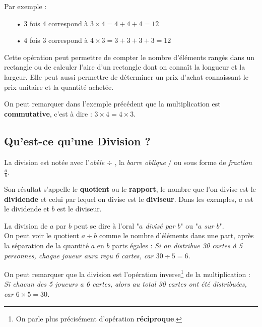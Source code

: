 \documentclass[a4paper, twoside]{article}
\begin{document}
			{\noindent Par exemple :}

			\begin{itemize}
			\onehalfspacing
			\item[•] 3 fois 4 correspond à $3 \times 4 = 4 + 4 + 4 = 12$
			\item[•] 4 fois 3 correspond à $4 \times 3 = 3 + 3 + 3 + 3 = 12$
			
			\end{itemize}
			\singlespacing
			\vspace{-2 mm}

			Cette opération peut permettre de compter le nombre d'éléments rangés 
			dans un rectangle ou de calculer l'aire d'un rectangle dont on connaît la longueur et la largeur. 
			Elle peut aussi permettre de déterminer un prix d'achat connaissant le prix unitaire et la quantité achetée.

			On peut remarquer dans l'exemple précédent que la multiplication 
			est \textbf{commutative}, c'est à dire : $3 \times 4 = 4 \times 3$.

			\vspace{5 mm}

		\subsection*{Qu'est-ce qu'une Division ?}

			La division est notée avec l'\textit{obèle} $\div$ ,
			la \textit{barre oblique} $ / $ ou sous forme de \textit{fraction} {\Large $ \frac{a}{b} $}.
			
			Son résultat s'appelle le \textbf{quotient} ou 
			le \textbf{rapport}, le nombre que l'on divise est le \textbf{dividende} et celui par 
			lequel on divise est le \textbf{diviseur}. 
			Dans les exemples, $a$ est le dividende et $b$ est le diviseur.

			La division de $a$ par $b$ peut se dire à l'oral "\textit{$a$ divisé par $b$}" ou "\textit{$a$ sur $b$}".\\


			On peut voir le quotient $a \div b$ comme le nombre d'éléments dans une part, 
			après la séparation de la quantité $a$ en $b$ parts égales : 
			\textit{Si on distribue 30 cartes à 5 personnes, chaque joueur aura reçu 6 cartes, car $ 30 \div 5 = 6$. }
			
			On peut remarquer que la division est l'opération 
			inverse\footnote{On parle plus précisément d'opération \textbf{réciproque}.} de la multiplication :
			\textit{Si chacun des 5 joueurs a 6 cartes, alors au total 30 cartes ont été distribuées, car $ 6 \times 5 = 30$. }\\
			
\end{document}
